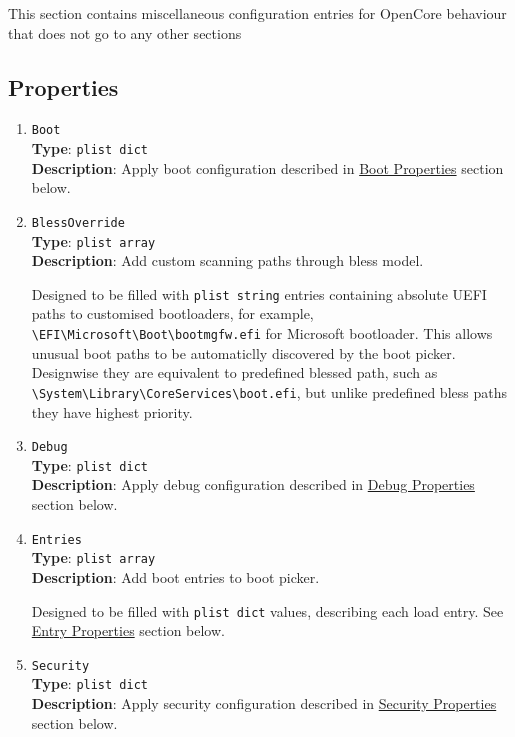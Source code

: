 \documentclass[]{article}
\makeatletter
\renewcommand{\label}[1]{%
\zref@wrapper@immediate{\oldlabel{#1}}}  %
\makeatother
\begin{document}
This section contains miscellaneous configuration entries for OpenCore
behaviour that does not go to any other sections

\subsection{Properties}\label{miscprops}

\begin{enumerate}
\item
  \texttt{Boot}\\
  \textbf{Type}: \texttt{plist\ dict}\\
  \textbf{Description}: Apply boot configuration described in
  \hyperref[miscbootprops]{Boot Properties} section below.

\item
  \texttt{BlessOverride}\\
  \textbf{Type}: \texttt{plist\ array}\\
  \textbf{Description}: Add custom scanning paths through bless model.

  Designed to be filled with \texttt{plist\ string} entries containing
  absolute UEFI paths to customised bootloaders, for example,
  \texttt{\textbackslash EFI\textbackslash Microsoft\textbackslash Boot\textbackslash bootmgfw.efi}
  for Microsoft bootloader. This allows unusual boot paths to be automaticlly
  discovered by the boot picker. Designwise they are equivalent to predefined blessed path, such as
  \texttt{\textbackslash System\textbackslash Library\textbackslash CoreServices\textbackslash boot.efi},
  but unlike predefined bless paths they have highest priority.

\item
  \texttt{Debug}\\
  \textbf{Type}: \texttt{plist\ dict}\\
  \textbf{Description}: Apply debug configuration described in
  \hyperref[miscdebugprops]{Debug Properties} section below.

\item
  \texttt{Entries}\\
  \textbf{Type}: \texttt{plist\ array}\\
  \textbf{Description}: Add boot entries to boot picker.

  Designed to be filled with \texttt{plist\ dict} values, describing each load entry.
  See \hyperref[miscentryprops]{Entry Properties} section below.

\item
  \texttt{Security}\\
  \textbf{Type}: \texttt{plist\ dict}\\
  \textbf{Description}: Apply security configuration described in
  \hyperref[miscsecurityprops]{Security Properties} section below.


\end{enumerate}
\end{document}
